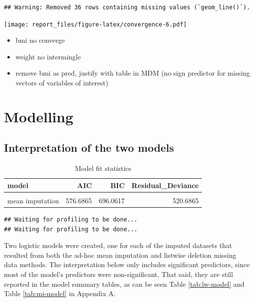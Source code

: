 \documentclass[
]{article}
\providecommand{\tightlist}{%
  \setlength{\itemsep}{0pt}\setlength{\parskip}{0pt}}
\begin{document}
\begin{verbatim}
## Warning: Removed 36 rows containing missing values (`geom_line()`).
\end{verbatim}

\texttt{[image: report\_files/figure-latex/convergence-6.pdf]}

\begin{itemize}
\tightlist
\item
  bmi no converge
\item
  weight no intermingle
\item
  remove bmi as pred, justify with table in MDM (no sign predictor for missing vectors of variables of interest)
\end{itemize}

\hypertarget{modelling}{%
\section{Modelling}\label{modelling}}

\hypertarget{interpret}{%
\subsection{Interpretation of the two models}\label{interpret}}

\begin{table}[!h]

\caption{\label{tab:model-compare}Model fit statistics}
\centering
\begin{tabular}[t]{lrrr}
\toprule
model & AIC & BIC & Residual\_Deviance\\
\midrule
\cellcolor{gray!6}{listwise deletion} & \cellcolor{gray!6}{342.6925} & \cellcolor{gray!6}{442.7129} & \cellcolor{gray!6}{286.6925}\\
mean imputation & 576.6865 & 696.0617 & 520.6865\\
\bottomrule
\end{tabular}
\end{table}

\begin{verbatim}
## Waiting for profiling to be done...
## Waiting for profiling to be done...
\end{verbatim}

Two logistic models were created, one for each of the imputed datasets that resulted from both the ad-hoc mean imputation and listwise deletion missing data methods. The interpretation below only includes significant predictors, since most of the model's predictors were non-significant. That said, they are still reported in the model summary tables, as can be seen Table \ref{tab:lw-model} and Table \ref{tab:mi-model} in Appendix A.
\end{document}

